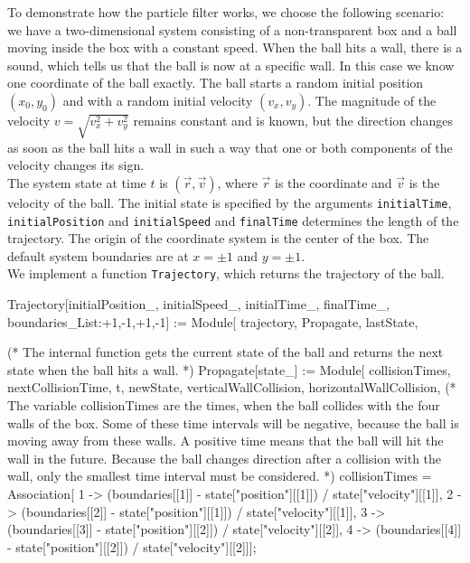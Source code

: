 \documentclass{tstextbook}
\begin{document}
\begin{example}
To demonstrate how the particle filter works, we choose the following scenario:\\

we have a two-dimensional system consisting of a non-transparent box and a ball moving inside the box with a constant speed. When the ball hits a wall, there is a sound, which tells us that the ball is now at a specific wall. In this case we know one coordinate of the ball exactly. The ball starts a random initial position $(x_0,y_0)$ and with a random initial velocity $(v_x,v_y)$. The magnitude of the velocity $v=\sqrt{v_x^2+v_y^2}$ remains constant and is known, but the direction changes as soon as the ball hits a wall in such a way that one or both components of the velocity changes its sign.\\

The system state at time $t$ is $(\vec{r},\vec{v})$, where $\vec{r}$ is the coordinate and $\vec{v}$ is the velocity of the ball. The initial state is specified by the arguments \texttt{initialTime}, \texttt{initialPosition} and \texttt{initialSpeed} and \texttt{finalTime} determines the length of the trajectory. The origin of the coordinate system is the center of the box. The default system boundaries are at $x=\pm 1$ and $y=\pm 1$.\\

We implement a function \texttt{Trajectory}, which returns the trajectory of the ball. 
\begin{mathematica}
Trajectory[initialPosition_, initialSpeed_, initialTime_, finalTime_,
   boundaries_List:{+1,-1,+1,-1}] := Module[
   {trajectory, Propagate, lastState},

   (* The internal function gets the current state of the ball and returns the next
      state when the ball hits a wall. *) 
   Propagate[state_] := Module[
      {collisionTimes, nextCollisionTime, t, newState, verticalWallCollision,
       horizontalWallCollision},
      (* The variable collisionTimes are the times, when the ball collides with
         the four walls of the box. Some of these time intervals will be negative,
         because the ball is moving away from these walls. A positive time means
         that the ball will hit the wall in the future. Because the ball changes
         direction after a collision with the wall, only the smallest time interval
         must be considered. *) 
      collisionTimes = Association[
         1 -> (boundaries[[1]] - state["position"][[1]]) / state["velocity"][[1]],
         2 -> (boundaries[[2]] - state["position"][[1]]) / state["velocity"][[1]],
         3 -> (boundaries[[3]] - state["position"][[2]]) / state["velocity"][[2]],
         4 -> (boundaries[[4]] - state["position"][[2]]) / state["velocity"][[2]]];


\end{mathematica}
\end{example}
\end{document}
